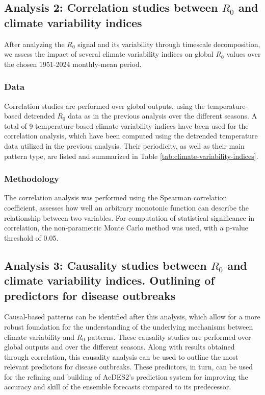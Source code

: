 \documentclass[10pt,twocolumn]{wlscirep}
\begin{document}
\subsection{Analysis 2: Correlation studies between $R_0$ and climate variability indices} \label{sec-methods-2}
After analyzing the $R_0$ signal and its variability through timescale decomposition, we assess the impact of several climate variability indices on global $R_0$ values over the chosen 1951-2024 monthly-mean period.

\subsubsection{Data} \label{sec-methods-2-data}

Correlation studies are performed over global outputs, using the temperature-based detrended $R_0$ data as in the previous analysis over the different seasons. A total of 9 temperature-based climate variability indices have been used for the correlation analysis, which have been computed using the detrended temperature data utilized in the previous analysis. Their periodicity, as well as their main pattern type, are listed and summarized in Table \ref{tab:climate-variability-indices}.


\subsubsection{Methodology} \label{sec-methods-2-methodology}

The correlation analysis was performed using the Spearman correlation coefficient, assesses how well an arbitrary monotonic function can describe the relationship between two variables\cite{spearman_1904}. For computation of statistical significance in correlation, the non-parametric Monte Carlo method was used\cite{new_2000}, with a p-value threshold of 0.05.


\subsection{Analysis 3: Causality studies between $R_0$ and climate variability indices. Outlining of predictors for disease outbreaks} \label{sec-methods-3}

Causal-based patterns can be identified after this analysis, which allow for a more robust foundation for the understanding of the underlying mechanisms between climate variability and $R_0$ patterns. These causality studies are performed over global outputs and over the different seasons. Along with results obtained through correlation, this causality analysis can be used to outline the most relevant predictors for disease outbreaks. These predictors, in turn, can be used for the refining and building of AeDES2's prediction system for improving the accuracy and skill of the ensemble forecasts compared to its predecessor.
\end{document}
